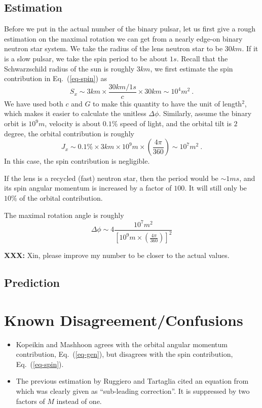 \documentclass[aps,showpacs,onecolumn,floats,prd,superscriptaddress,nofootinbib]{revtex4}
\begin{document}
\subsection{Estimation}

Before we put in the actual number of the binary pulsar, let us first give a rough estimation on the maximal rotation we can get from a nearly edge-on binary neutron star system.
We take the radius of the lens neutron star to be $30km$.
If it is a slow pulsar, we take the spin period to be about $1s$.
Recall that the Schwarzschild radius of the sun is roughly $3km$, we first estimate the spin contribution in Eq.~(\ref{eq-spin}) as
\begin{equation}
S_x \sim 3km \times \frac{30km/1s}{c} \times 30km \sim 10^4 m^2~.
\end{equation}
We have used both $c$ and $G$ to make this quantity to have the unit of length$^2$, which makes it easier to calculate the unitless $\Delta\phi$.
Similarly, assume the binary orbit is $10^9 m$, velocity is about $0.1\%$ speed of light, and the orbital tilt is $2$ degree, the orbital contribution is roughly
\begin{equation}
J_x \sim 0.1\% \times 3km \times 10^9 m \times\left( \frac{4\pi}{360} \right) \sim 10^7 m^2~.
\end{equation}
In this case, the spin contribution is negligible.

If the lens is a recycled (fast) neutron star, then the period would be $\sim 1ms$, and its spin angular momentum is increased by a factor of $100$.
It will still only be $10\%$ of the orbital contribution.

The maximal rotation angle is roughly
\begin{equation}
\Delta\phi \sim 4 \frac{10^7 m^2}{\left[10^9m\times\left(\frac{4\pi}{360}\right)\right]^2}
\end{equation}

{\bf XXX:} Xin, please improve my number to be closer to the actual values.

\subsection{Prediction}

\section{Known Disagreement/Confusions}

\begin{itemize}
\item Kopeikin and Mashhoon \cite{KopMas01} agrees with the orbital angular momentum contribution, Eq.~(\ref{eq-gen}), but disagrees with the spin contribution, Eq.~(\ref{eq-spin}).
\item The previous estimation by Ruggiero and Tartaglia \cite{RugTar06} cited an equation from \cite{Ser04} which was clearly given as ``sub-leading correction''. It is suppressed by two factors of $M$ instead of one.
\end{itemize}



\end{document}
